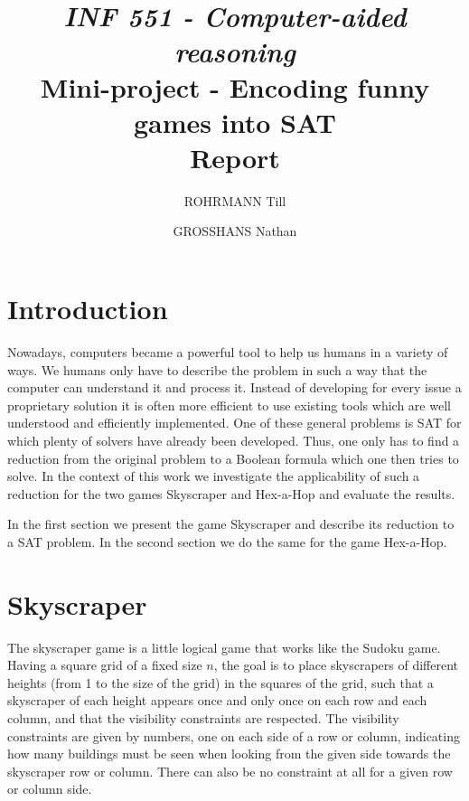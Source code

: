 \documentclass[a4paper, 12pt, titlepage]{article}
\title
{{\em INF 551 - Computer-aided reasoning}\\
Mini-project - Encoding funny games into SAT\\
{\bf Report}}
\author{ROHRMANN Till \and GROSSHANS Nathan}
\date{}
\begin{document}
\maketitle


\section{Introduction}
Nowadays, computers became a powerful tool to help us humans in a variety of ways.
We humans only have to describe the problem in such a way that the computer can understand it and process it.
Instead of developing for every issue a proprietary solution it is often more efficient to use existing tools which are well understood and efficiently implemented.
One of these general problems is SAT for which plenty of solvers have already been developed.
Thus, one only has to find a reduction from the original problem to a Boolean formula which one then tries to solve.
In the context of this work we investigate the applicability of such a reduction for the two games Skyscraper and Hex-a-Hop and evaluate the results.

In the first section we present the game Skyscraper and describe its reduction to a SAT problem.
In the second section we do the same for the game Hex-a-Hop.

\section{Skyscraper}
The skyscraper game is a little logical game that works like the Sudoku game.
Having a square grid of a fixed size $n$, the goal is to place skyscrapers of
different heights (from 1 to the size of the grid) in the squares of the grid,
such that a skyscraper of each height appears once and only once on each row and
each column, and that the visibility constraints are respected. The visibility
constraints are given by numbers, one on each side of a row or column,
indicating how many buildings must be seen when looking from the given side
towards the skyscraper row or column. There can also be no constraint at all for
a given row or column side.
\end{document}
